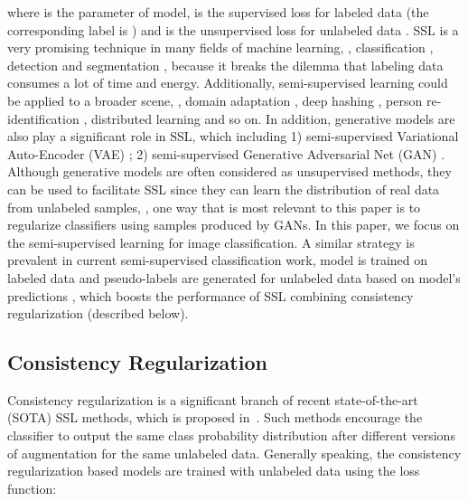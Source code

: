 \documentclass[lettersize,journal]{IEEEtran}
\theoremstyle{plain}
\theoremstyle{definition}
\theoremstyle{remark}
\begin{document}
where  is the parameter of model,  is the supervised loss for labeled data  (the corresponding label is ) and  is the unsupervised loss for unlabeled data .
SSL is a very promising technique in many fields of machine learning, \eg, classification \cite{sohn2020fixmatch,rizve2021in,tai2021sinkhorn,zhao2022dc,duan2022rda}, detection \cite{jeong2019consistency,sohn2020simple} and segmentation \cite{papandreou2015weakly,shi2021inconsistency,yang2022st++}, because it breaks the dilemma that labeling data consumes a lot of time and energy. 
Additionally, semi-supervised learning could be applied to a broader scene, \eg, domain adaptation \cite{chen2020semi}, deep hashing \cite{hu2021adversarial}, 
person re-identification \cite{qi2020progressive}, 
distributed learning \cite{fierimonte2016fully} and so on. In addition, generative models are also play a significant role in SSL, which including 1) semi-supervised Variational Auto-Encoder (VAE)  \cite{kulkarni2015deep,paige2017learning,li2019disentangled,joy2020rethinking}; 2) semi-supervised Generative Adversarial Net (GAN) \cite{dai2017good,salimans2016improved,qi2018global,wei2018improving}. Although generative models are often considered as unsupervised methods, they can be used to facilitate SSL since they can learn the distribution of real data from unlabeled samples, \eg, one way that is most relevant to this paper is to regularize classifiers using samples produced by GANs. In this paper, we focus on the semi-supervised learning for image classification. A similar strategy is prevalent in current semi-supervised classification work, model is trained on labeled data and pseudo-labels are generated for unlabeled data based on model's predictions \cite{lee2013pseudo,berthelot2019mixmatch,berthelot2020remixmatch,sohn2020fixmatch,li2021comatch}, which boosts the performance of SSL combining consistency regularization (described below). 

\subsection{Consistency Regularization}
Consistency regularization is a significant branch of recent state-of-the-art (SOTA) SSL methods, which is proposed in~\cite{bachman2014learning}. 
Such methods encourage the classifier to output the same class probability distribution after different versions of augmentation for the same unlabeled data. Generally speaking, the consistency regularization based models are trained with unlabeled data using the loss function: 
\end{document}

